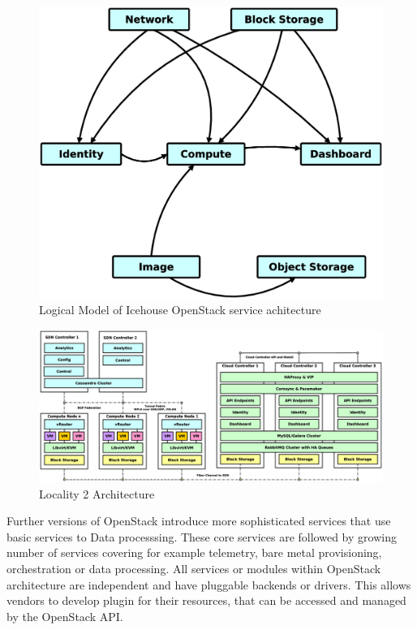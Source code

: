 \begin{figure}[h]
\centering
\includegraphics[scale=.13]{img/openstack_logical_model.eps}
\caption{Logical Model of Icehouse OpenStack service achitecture}
\label{fig:moduls}
\end{figure}

\begin{figure}[!h]
\centering
\includegraphics[scale=.15]{img/use_case_ha_sdn.eps}
\caption{Locality 2 Architecture}
\label{fig:pisek}
\end{figure}

Further versions of OpenStack introduce more sophisticated services that use basic services to Data processsing.
These core services are followed by growing number of services covering for example telemetry, bare metal provisioning, orchestration or data processing. All services or modules within OpenStack architecture are independent and have pluggable backends or drivers. This allows vendors to develop plugin for their resources, that can be accessed and managed by the OpenStack API.

